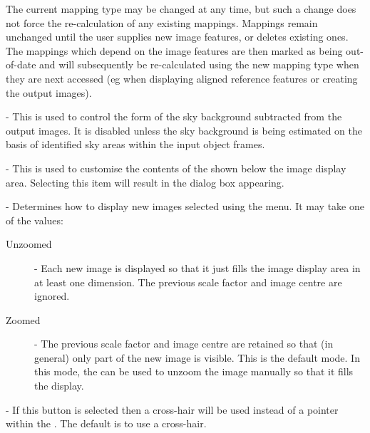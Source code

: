 \begin{description}
The current mapping type may be changed at any time, but such a change
does not force the re-calculation of any existing mappings. Mappings
remain unchanged until the user supplies new image features, or deletes
existing ones. The mappings which depend on the image features are then
marked as being out-of-date and will subsequently be re-calculated using
the new mapping type when they are next accessed (eg when displaying
aligned reference features or creating the output images).

\item [\mylabel{POLREG_SKY}{\em Sky}] - This is used to control the form
of the sky background subtracted from the output images. It is disabled
unless the sky background is being estimated on the basis of identified
sky areas within the input object frames.


\item [\mylabel{POLREG_STATUS_ITEMS}{\em Status Items}] - This is used to
customise the contents of the 
shown below the image display area. Selecting this item will result in the 
 dialog
box appearing.

\item [\mylabel{POLREG_VIEW}{\em View}] - Determines how to display new
images selected using the 
menu. It may take one of the values:

\begin{description}

\item [Unzoomed] - Each new image is displayed so that it just fills the 
image display area in at least one dimension. The previous scale factor
and image centre are ignored.

\item [Zoomed] - The previous scale factor and image centre are retained
so that (in general) only part of the new image is visible. This is the
default mode. In this mode, the  can
be used to unzoom the image manually so that it fills the display.

\end{description}

\item [\mylabel{POLREG_USE_CROSS_HAIR}{\em Use Cross-hair}] -
If this button is selected then a cross-hair will be used instead of a
pointer within the .
The default is to use a cross-hair.


\end{description}

